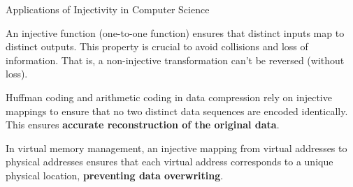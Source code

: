 \documentclass[10pt]{beamer}
\begin{document}
\begin{frame}{Applications of Injectivity in Computer Science}
\footnotesize 

\begin{myredbox}[title=Main Idea]
  An injective function (one-to-one function) ensures that distinct inputs map to distinct outputs. This property is crucial to avoid collisions and loss of information.  That is, a non-injective transformation can't be reversed (without loss).
\end{myredbox}
\vfill 

\begin{mygreenbox}[title=Application: Data Compression (Lossless Encoding)]
Huffman coding and arithmetic coding in data compression rely on injective mappings to ensure that no two distinct data sequences are encoded identically.  This ensures \textbf{accurate reconstruction of the original data}.
\end{mygreenbox}

\vfill 
\begin{mygreenbox}[title=Application: Memory Addressing]
In virtual memory management, an injective mapping from virtual addresses to physical addresses ensures that each virtual address corresponds to a unique physical location, \textbf{preventing data overwriting}.
\end{mygreenbox}
\vfill 
\end{frame}
\end{document}
